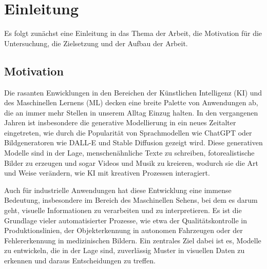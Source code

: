 \chapter{Einleitung} \label{ch:intro}

Es folgt zunächst eine Einleitung in das Thema der Arbeit, die Motivation für die Untersuchung, die Zielsetzung und der Aufbau der Arbeit.

\section{Motivation} \label{sec:motivation}

Die rasanten Enwicklungen in den Bereichen der Künstlichen Intelligenz (KI) und des Maschinellen Lernens (ML) decken eine breite Palette von Anwendungen ab, die an immer mehr Stellen in unserem Alltag Einzug halten. In den vergangenen Jahren ist insbesondere die generative Modellierung in ein neues Zeitalter eingetreten, wie durch die Popularität von Sprachmodellen wie ChatGPT oder Bildgeneratoren wie DALL-E und Stable Diffusion gezeigt wird. Diese generativen Modelle sind in der Lage, menschenähnliche Texte zu schreiben, fotorealistische Bilder zu erzeugen und sogar Videos und Musik zu kreieren, wodurch sie die Art und Weise verändern, wie KI mit kreativen Prozessen interagiert.

Auch für industrielle Anwendungen hat diese Entwicklung eine immense Bedeutung, insbesondere im Bereich des Maschinellen Sehens, bei dem es darum geht, visuelle Informationen zu verarbeiten und zu interpretieren. Es ist die Grundlage vieler automatisierter Prozesse, wie etwa der Qualitätskontrolle in Produktionslinien, der Objekterkennung in autonomen Fahrzeugen oder der Fehlererkennung in medizinischen Bildern. Ein zentrales Ziel dabei ist es, Modelle zu entwickeln, die in der Lage sind, zuverlässig Muster in visuellen Daten zu erkennen und daraus Entscheidungen zu treffen.

